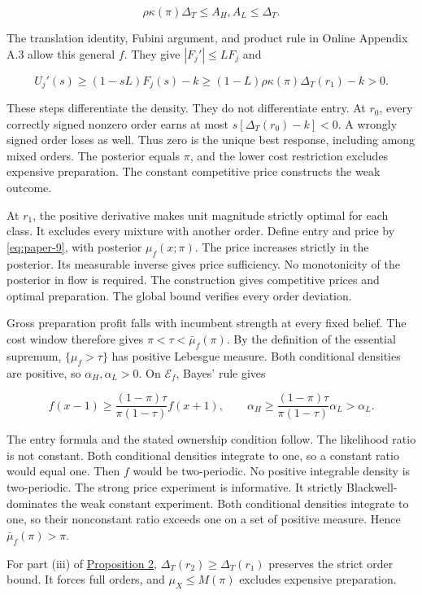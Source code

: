 \[
\rho\kappa(\pi)\Delta_T\le A_H,A_L\le\Delta_T.
\]

The translation identity, Fubini argument, and product rule in Online Appendix A.3 allow this general \(f\).
They give \(|F_j'|\le LF_j\) and

\[
U_j'(s)\ge(1-sL)F_j(s)-k
\ge(1-L)\rho\kappa(\pi)\Delta_T(r_1)-k>0.
\]

These steps differentiate the density.
They do not differentiate entry.
At \(r_0\), every correctly signed nonzero order earns at most
\(s[\Delta_T(r_0)-k]<0\).
A wrongly signed order loses as well.
Thus zero is the unique best response, including among mixed orders.
The posterior equals \(\pi\), and the lower cost restriction excludes expensive preparation.
The constant competitive price constructs the weak outcome.
\par
At \(r_1\), the positive derivative makes unit magnitude strictly optimal for each class.
It excludes every mixture with another order.
Define entry and price by \eqref{eq:paper-9}, with posterior \(\mu_f(x;\pi)\).
The price increases strictly in the posterior.
Its measurable inverse gives price sufficiency.
No monotonicity of the posterior in flow is required.
The construction gives competitive prices and optimal preparation.
The global bound verifies every order deviation.

Gross preparation profit falls with incumbent strength at every fixed belief.
The cost window therefore gives \(\pi<\tau<\bar\mu_f(\pi)\).
By the definition of the essential supremum, \(\{\mu_f>\tau\}\) has positive Lebesgue measure.
Both conditional densities are positive, so \(\alpha_H,\alpha_L>0\).
On \(\mathcal E_f\), Bayes' rule gives

\[
f(x-1)\ge
\frac{(1-\pi)\tau}{\pi(1-\tau)}f(x+1),\qquad
\alpha_H\ge\frac{(1-\pi)\tau}{\pi(1-\tau)}\alpha_L>\alpha_L.
\]

The entry formula and the stated ownership condition follow.
The likelihood ratio is not constant.
Both conditional densities integrate to one, so a constant ratio would equal one.
Then \(f\) would be two-periodic.
No positive integrable density is two-periodic.
The strong price experiment is informative.
It strictly Blackwell-dominates the weak constant experiment.
Both conditional densities integrate to one, so their nonconstant ratio exceeds one on a set of positive measure.
Hence \(\bar\mu_f(\pi)>\pi\).
\par
For part (iii) of \hyperref[result-proposition-2]{Proposition 2},
\(\Delta_T(r_2)\ge\Delta_T(r_1)\) preserves the strict order bound.
It forces full orders, and \(\mu_X\le M(\pi)\) excludes expensive preparation.

